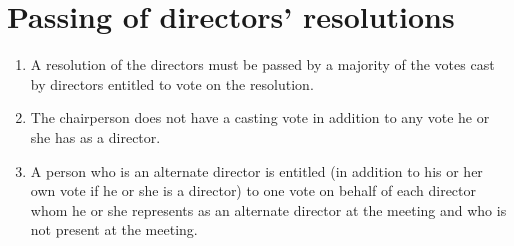 \section{Passing of directors' resolutions}

\begin{enumerate}[label=(\alph*)]
    \item A resolution of the directors must be passed by a majority of the votes cast by directors entitled to vote on the resolution.
    
    \item The chairperson does not have a casting vote in addition to any vote he or she has as a director.
    
    \item A person who is an alternate director is entitled (in addition to his or her own vote if he or she is a director) to one vote on behalf of each director whom he or she represents as an alternate director at the meeting and who is not present at the meeting.
\end{enumerate} 